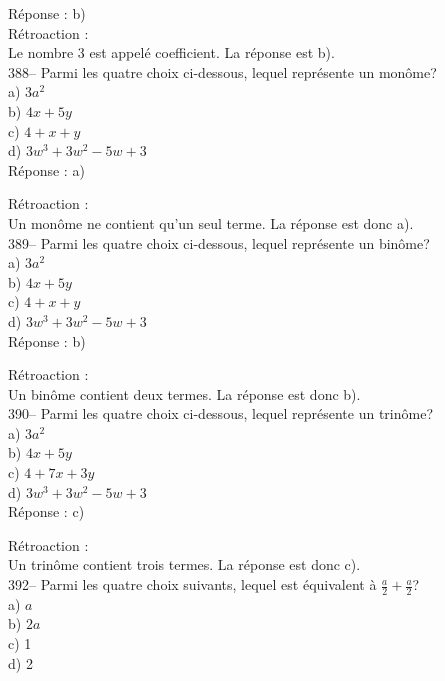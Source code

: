 ﻿\documentclass[letterpaper, 12pt]{article}
\begin{document}
R\'eponse : b)\\

R\'etroaction : \\
Le nombre 3 est appel\'e coefficient.  La r\'eponse est b).\\

388-- Parmi les quatre choix ci-dessous, lequel repr\'esente un mon\^ome?\\
a) $3a^{2}$\\
b) $4x+5y$\\
c) $4+x+y$\\
d) $3w^{3}+3w^{2}-5w+3$\\

R\'eponse : a)

R\'etroaction : \\
Un mon\^ome ne contient qu'un seul terme.  La r\'eponse est donc a).\\

389-- Parmi les quatre choix ci-dessous, lequel repr\'esente un bin\^ome?\\
a) $3a^{2}$\\
b) $4x+5y$\\
c) $4+x+y$\\
d) $3w^{3}+3w^{2}-5w+3$\\

R\'eponse : b)

R\'etroaction : \\
Un bin\^ome contient deux termes.  La r\'eponse est donc b).\\

390-- Parmi les quatre choix ci-dessous, lequel repr\'esente un trin\^ome?\\
a) $3a^{2}$\\
b) $4x+5y$\\
c) $4+7x+3y$\\
d) $3w^{3}+3w^{2}-5w+3$\\

R\'eponse : c)

R\'etroaction : \\
Un trin\^ome contient trois termes.  La r\'eponse est donc c).\\


392-- Parmi les quatre choix suivants, lequel est \'equivalent \`a
$\frac{a}{2}+\frac{a}{2}$?\\
a) $a$\\
b) $2a$\\
c) 1\\
d) 2\\
\end{document}
